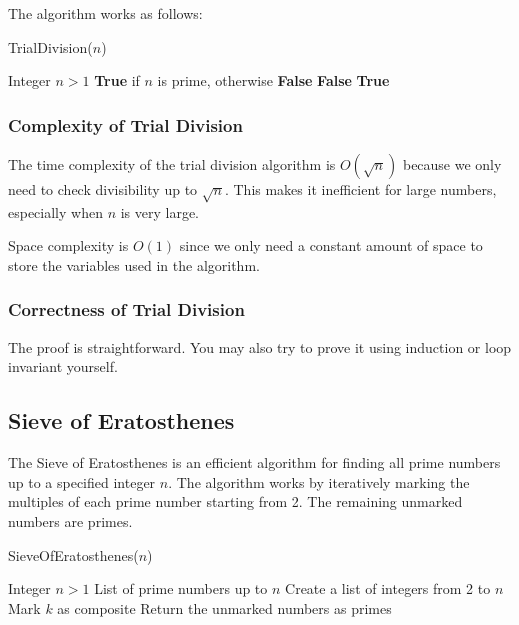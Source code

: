 \documentclass[oneside]{book}
\begin{document}
The algorithm works as follows:

\begin{algorithm}[H]
	\caption{TrialDivision($n$)}
	\begin{algorithmic}[1]
		\Require Integer \(n > 1\)
		\Ensure \textbf{True} if \(n\) is prime, otherwise \textbf{False}
		\State \Return \textbf{False} 
		\EndIf
		\EndFor
		\State \Return \textbf{True} 
	\end{algorithmic}
\end{algorithm}

\subsubsection{Complexity of Trial Division}
The time complexity of the trial division algorithm is \(O(\sqrt{n})\) because we only need to check divisibility up to \(\sqrt{n}\). This makes it inefficient for large numbers, especially when \(n\) is very large.

Space complexity is \(O(1)\) since we only need a constant amount of space to store the variables used in the algorithm.

\subsubsection{Correctness of Trial Division}
The proof is straightforward. You may also try to prove it using induction or loop invariant yourself.


\subsection{Sieve of Eratosthenes}
The Sieve of Eratosthenes is an efficient algorithm for finding all prime numbers up to a specified integer \( n \). The algorithm works by iteratively marking the multiples of each prime number starting from 2. The remaining unmarked numbers are primes.
\begin{algorithm}[H]
	\caption{SieveOfEratosthenes($n$)}
	\begin{algorithmic}[1]
		\Require Integer \(n > 1\)
		\Ensure List of prime numbers up to \(n\)
		\State Create a list of integers from 2 to \(n\)
		\State Mark \(k\) as composite
		\EndFor
		\EndIf
		\EndFor
		\State Return the unmarked numbers as primes
	\end{algorithmic}
\end{algorithm}
\end{document}
